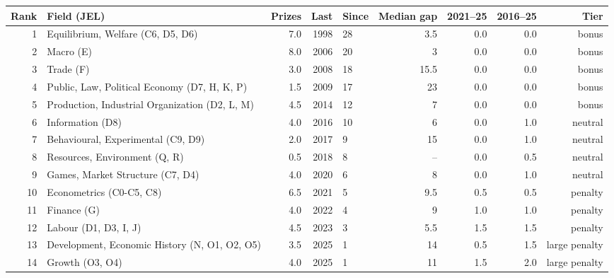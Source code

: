\begin{tabular}{@{}rlrrlrrrr@{}}
\toprule
Rank & Field (JEL) & Prizes & Last & Since & Median gap & 2021--25 & 2016--25 & Tier \\
\midrule
1 & Equilibrium, Welfare (C6, D5, D6) & 7.0 & 1998 & 28 & 3.5 & 0.0 & 0.0 & bonus \\
2 & Macro (E) & 8.0 & 2006 & 20 & 3 & 0.0 & 0.0 & bonus \\
3 & Trade (F) & 3.0 & 2008 & 18 & 15.5 & 0.0 & 0.0 & bonus \\
4 & Public, Law, Political Economy (D7, H, K, P) & 1.5 & 2009 & 17 & 23 & 0.0 & 0.0 & bonus \\
5 & Production, Industrial Organization (D2, L, M) & 4.5 & 2014 & 12 & 7 & 0.0 & 0.0 & bonus \\
6 & Information (D8) & 4.0 & 2016 & 10 & 6 & 0.0 & 1.0 & neutral \\
7 & Behavioural, Experimental (C9, D9) & 2.0 & 2017 & 9 & 15 & 0.0 & 1.0 & neutral \\
8 & Resources, Environment (Q, R) & 0.5 & 2018 & 8 & -- & 0.0 & 0.5 & neutral \\
9 & Games, Market Structure (C7, D4) & 4.0 & 2020 & 6 & 8 & 0.0 & 1.0 & neutral \\
10 & Econometrics (C0-C5, C8) & 6.5 & 2021 & 5 & 9.5 & 0.5 & 0.5 & penalty \\
11 & Finance (G) & 4.0 & 2022 & 4 & 9 & 1.0 & 1.0 & penalty \\
12 & Labour (D1, D3, I, J) & 4.5 & 2023 & 3 & 5.5 & 1.5 & 1.5 & penalty \\
13 & Development, Economic History (N, O1, O2, O5) & 3.5 & 2025 & 1 & 14 & 0.5 & 1.5 & large penalty \\
14 & Growth (O3, O4) & 4.0 & 2025 & 1 & 11 & 1.5 & 2.0 & large penalty \\
\bottomrule
\end{tabular}
